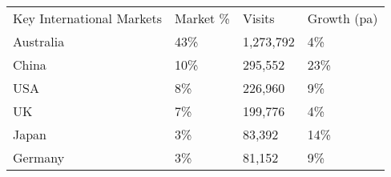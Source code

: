 \begin{tabular}[t]{p{3.3cm}>{\hfill}p{1.1cm}>{\hfill}p{1.3cm}>{\hfill}p{1.4cm}}
 Key International Markets & Market \% & Visits & Growth (pa) \\ 
 Australia & 43\% & 1,273,792 & 4\% \\ 
  China & 10\% &   295,552 & 23\% \\ 
  USA & 8\% &   226,960 & 9\% \\ 
  UK & 7\% &   199,776 & 4\% \\ 
  Japan & 3\% &    83,392 & 14\% \\ 
  Germany & 3\% &    81,152 & 9\% \\ 
  \end{tabular}
